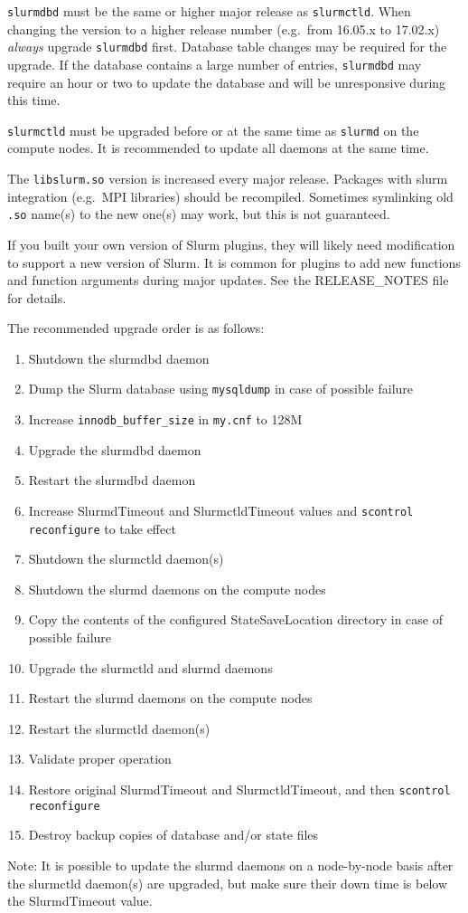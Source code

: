 \texttt{slurmdbd} must be the same or higher major release as \texttt{slurmctld}. When changing the version to a higher release number (e.g.\ from 16.05.x to 17.02.x) \emph{always} upgrade \texttt{slurmdbd} first. Database table changes may be required for the upgrade. If the database contains a large number of entries, \texttt{slurmdbd} may require an hour or two to update the database and will be unresponsive during this time.

\texttt{slurmctld} must be upgraded before or at the same time as \texttt{slurmd} on the compute nodes. It is recommended to update all daemons at the same time.

The \texttt{libslurm.so} version is increased every major release. Packages with slurm integration (e.g.\ MPI libraries) should be recompiled. Sometimes symlinking old \texttt{.so} name(s) to the new one(s) may work, but this is not guaranteed.

If you built your own version of Slurm plugins, they will likely need modification to support a new version of Slurm. It is common for plugins to add new functions and function arguments during major updates. See the RELEASE\_NOTES file for details.

The recommended upgrade order is as follows:

\begin{enumerate}
  \item Shutdown the slurmdbd daemon
  \item Dump the Slurm database using \texttt{mysqldump} in case of possible failure
  \item Increase \texttt{innodb\_buffer\_size} in \texttt{my.cnf} to 128M
  \item Upgrade the slurmdbd daemon
  \item Restart the slurmdbd daemon
  \item Increase SlurmdTimeout and SlurmctldTimeout values and \texttt{scontrol reconfigure} to take effect
  \item Shutdown the slurmctld daemon(s)
  \item Shutdown the slurmd daemons on the compute nodes
  \item Copy the contents of the configured StateSaveLocation directory in case of possible failure
  \item Upgrade the slurmctld and slurmd daemons
  \item Restart the slurmd daemons on the compute nodes
  \item Restart the slurmctld daemon(s)
  \item Validate proper operation
  \item Restore original SlurmdTimeout and SlurmctldTimeout, and then \texttt{scontrol reconfigure}
  \item Destroy backup copies of database and/or state files
\end{enumerate}

Note: It is possible to update the slurmd daemons on a node-by-node basis after the slurmctld daemon(s) are upgraded, but make sure their down time is below the SlurmdTimeout value.
